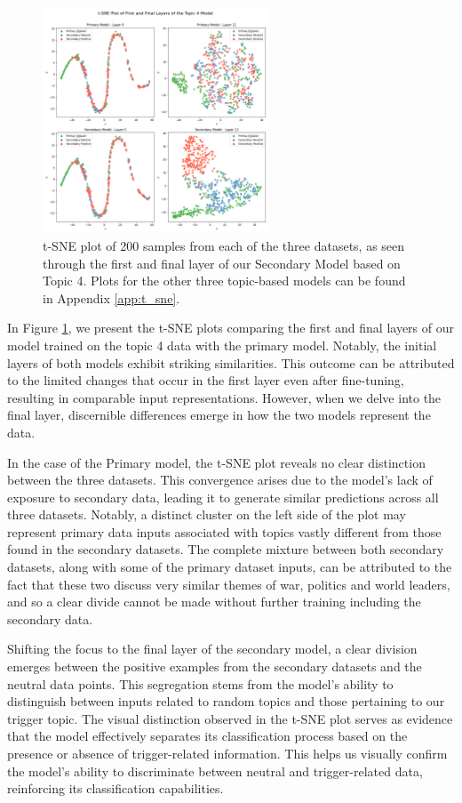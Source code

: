 \begin{figure}[ht]
    \centering
    \includegraphics[width=0.6\textwidth]{graphs/tsne/topic_4.png}
    \caption{t-SNE plot of 200 samples from each of the three datasets, as seen through the first and final layer of our Secondary Model based on Topic 4. Plots for the other three topic-based models can be found in Appendix \ref{app:t_sne}.}
    \label{fig:t_sne_plot}
\end{figure}

In Figure \ref{fig:t_sne_plot}, we present the t-SNE plots comparing the first and final layers of our model trained on the topic 4 data with the primary model. Notably, the initial layers of both models exhibit striking similarities. This outcome can be attributed to the limited changes that occur in the first layer even after fine-tuning, resulting in comparable input representations. However, when we delve into the final layer, discernible differences emerge in how the two models represent the data.

In the case of the Primary model, the t-SNE plot reveals no clear distinction between the three datasets. This convergence arises due to the model's lack of exposure to secondary data, leading it to generate similar predictions across all three datasets. Notably, a distinct cluster on the left side of the plot may represent primary data inputs associated with topics vastly different from those found in the secondary datasets. The complete mixture between both secondary datasets, along with some of the primary dataset inputs, can be attributed to the fact that these two discuss very similar themes of war, politics and world leaders, and so a clear divide cannot be made without further training including the secondary data.

Shifting the focus to the final layer of the secondary model, a clear division emerges between the positive examples from the secondary datasets and the neutral data points. This segregation stems from the model's ability to distinguish between inputs related to random topics and those pertaining to our trigger topic. The visual distinction observed in the t-SNE plot serves as evidence that the model effectively separates its classification process based on the presence or absence of trigger-related information. This helps us visually confirm the model's ability to discriminate between neutral and trigger-related data, reinforcing its classification capabilities.

